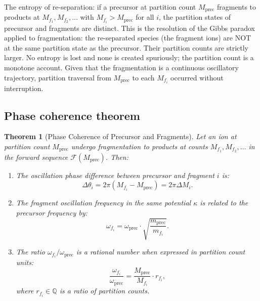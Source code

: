 \documentclass[twocolumn,10pt,a4paper]{article}
\theoremstyle{thmstyle}
\newtheorem{theorem}{Theorem}[section]
\theoremstyle{definition}
\theoremstyle{remark}
\newcommand{\Q}{\mathbb{Q}}
\newcommand{\calF}{\mathcal{F}}
\begin{document}
The entropy of re-separation: if a precursor at partition count $M_{\text{prec}}$
fragments to products at $M_{f_1}, M_{f_2}, \ldots$ with
$M_{f_i} > M_{\text{prec}}$ for all $i$, the partition states of
precursor and fragments are distinct. This is the resolution of the
Gibbs paradox applied to fragmentation: the re-separated species (the
fragment ions) are NOT at the same partition state as the precursor.
Their partition counts are strictly larger. No entropy is lost and none
is created spuriously; the partition count is a monotone account.
Given that the fragmentation is a continuous oscillatory trajectory, partition traversal from $M_{\text{prec}}$ to each
$M_{f_i}$ occurred without interruption.

\subsection{Phase coherence theorem}

\begin{theorem}[Phase Coherence of Precursor and Fragments]
\label{thm:phase-coherence}
Let an ion at partition count $M_{\text{prec}}$ undergo fragmentation
to products at counts $M_{f_1}, M_{f_2}, \ldots$ in the forward sequence
$\calF(M_{\text{prec}})$. Then:
\begin{enumerate}[nosep,label=(\roman*)]
\item The oscillation phase difference between precursor and fragment $i$ is:
\begin{equation}
\Delta\theta_i = 2\pi(M_{f_i} - M_{\text{prec}}) = 2\pi\Delta M_i.
\label{eq:phase-diff}
\end{equation}
\item The fragment oscillation frequency in the same potential $\kappa$
is related to the precursor frequency by:
\begin{equation}
\omega_{f_i} = \omega_{\text{prec}} \cdot \sqrt{\frac{m_{\text{prec}}}{m_{f_i}}}.
\label{eq:frag-freq}
\end{equation}
\item The ratio $\omega_{f_i}/\omega_{\text{prec}}$ is a rational number
when expressed in partition count units:
\begin{equation}
\frac{\omega_{f_i}}{\omega_{\text{prec}}} = \frac{M_{\text{prec}}}{M_{f_i}}
\cdot r_{f_i},
\label{eq:rational}
\end{equation}
where $r_{f_i} \in \Q$ is a ratio of partition counts.
\end{enumerate}
\end{theorem}
\end{document}
